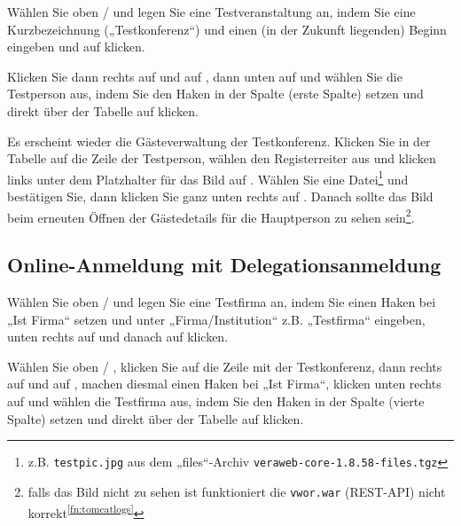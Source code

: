 \documentclass{tarentanleitung}
\newcommand{\vwiaverssw}{1.8.58}
\begin{document}
Wählen Sie oben  /  und legen Sie eine Testveranstaltung an, indem Sie eine
Kurzbezeichnung („Testkonferenz“) und einen (in der Zukunft liegenden)
Beginn eingeben und auf  klicken.

Klicken Sie dann rechts auf  und auf
, dann unten auf 
und wählen Sie die Testperson aus, indem Sie den Haken in der Spalte
 (erste Spalte) setzen und direkt über der Tabelle auf
 klicken.

Es erscheint wieder die Gästeverwaltung der Testkonferenz. Klicken Sie
in der Tabelle auf die Zeile der Testperson, wählen den Registerreiter
 aus und klicken links unter dem Platzhalter
für das Bild auf . Wählen Sie eine
Datei\Hair\footnote{\label{fn:testpic}z.B. \texttt{testpic.jpg} aus dem
„files“-Archiv \texttt{veraweb-core-\vwiaverssw{}-files.tgz}} und bestätigen
Sie, dann klicken Sie ganz unten rechts auf .
Danach sollte das Bild beim erneuten Öffnen der Gästedetails für
die Hauptperson zu sehen sein\Hair\footnote{falls das Bild nicht
zu sehen ist funktioniert die \texttt{vwor.war} (REST-API) nicht
korrekt\Hair\textsuperscript{\ref{fn:tomcatlogs}}}.

\subsection{Online-Anmeldung mit Delegationsanmeldung}

Wählen Sie oben  / 
und legen Sie eine Testfirma an, indem Sie einen Haken bei „Ist Firma“
setzen und unter „Firma/Institution“ z.B. „Testfirma“ eingeben, unten
rechts auf  und danach auf
 klicken.

Wählen Sie oben  /
, klicken Sie auf die Zeile mit
der Testkonferenz, dann rechts auf 
und auf , machen diesmal einen Haken bei
„Ist Firma“, klicken unten rechts auf  und wählen
die Testfirma aus, indem Sie den Haken in der Spalte 
(vierte Spalte) setzen und direkt über der Tabelle auf
 klicken.
\end{document}
